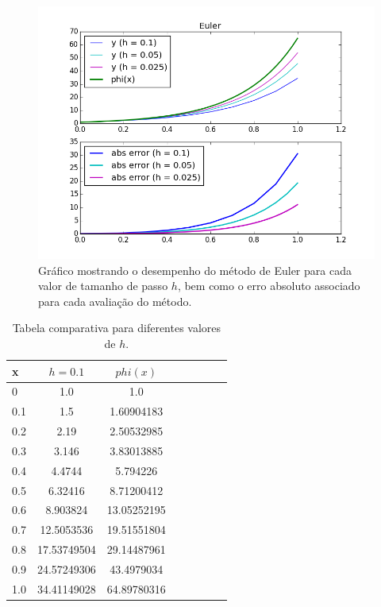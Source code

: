 \documentclass[a4paper]{article}
\begin{document}
\begin{figure}[!h]
\centering
\includegraphics[width=1.0\textwidth]{plots/Euler.png}
\caption{\label{fig:euler}Gráfico mostrando o desempenho do método de Euler para cada valor de tamanho de passo $h$, bem como o erro absoluto associado para cada avaliação do método.}
\end{figure}

\begin{table}[!h]
\centering
\begin{tabular}{l*{6}{c}r}

x               & $h=0.1$ & $phi(x)$ \\
\hline
0                   & 1.0 & 1.0          \\
0.1                 & 1.5 & 1.60904183   \\
0.2                 & 2.19 & 2.50532985   \\
0.3                 & 3.146 & 3.83013885   \\
0.4                 & 4.4744 & 5.794226     \\
0.5                 & 6.32416 & 8.71200412   \\
0.6                 & 8.903824 & 13.05252195  \\
0.7                 & 12.5053536 & 19.51551804  \\
0.8                 & 17.53749504 & 29.14487961  \\
0.9                 & 24.57249306 & 43.4979034   \\
1.0                 & 34.41149028 & 64.89780316  \\
\end{tabular}
\caption{\label{tab:euler}Tabela comparativa para diferentes valores de $h$.}
\end{table}
\end{document}
